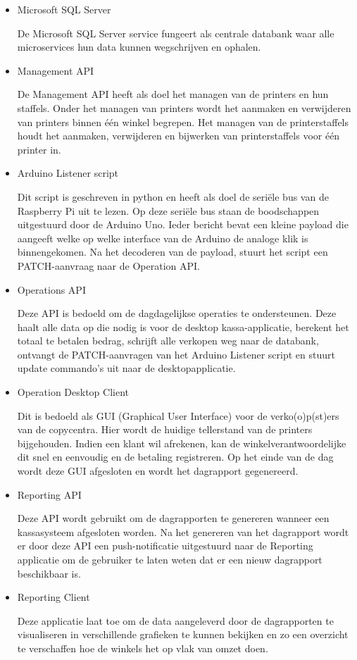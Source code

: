 \begin{itemize}
    \item Microsoft SQL Server
    
    De Microsoft SQL Server service fungeert als centrale databank waar alle microservices hun data kunnen wegschrijven en ophalen.
    
    \item Management API
    
    De Management API heeft als doel het managen van de printers en hun staffels. Onder het managen van printers wordt het aanmaken en verwijderen van printers binnen één winkel begrepen. Het managen van de printerstaffels houdt het aanmaken, verwijderen en bijwerken van printerstaffels voor één printer in.
    
    \item Arduino Listener script
    
    Dit script is geschreven in python en heeft als doel de seriële bus van de Raspberry Pi uit te lezen. Op deze seriële bus staan de boodschappen uitgestuurd door de Arduino Uno. Ieder bericht bevat een kleine payload die aangeeft welke op welke interface van de Arduino de analoge klik is binnengekomen. Na het decoderen van de payload, stuurt het script een PATCH-aanvraag naar de Operation API.
    
    \item Operations API
    
    Deze API is bedoeld om de dagdagelijkse operaties te ondersteunen. Deze haalt alle data op die nodig is voor de desktop kassa-applicatie, berekent het totaal te betalen bedrag, schrijft alle verkopen weg naar de databank, ontvangt de PATCH-aanvragen van het Arduino Listener script en stuurt update commando's uit naar de desktopapplicatie.
    
    \item Operation Desktop Client
    
    Dit is bedoeld als GUI (Graphical User Interface) voor de verko(o)p(st)ers van de copycentra. Hier wordt de huidige tellerstand van de printers bijgehouden. Indien een klant wil afrekenen, kan de winkelverantwoordelijke dit snel en eenvoudig en de betaling registreren. Op het einde van de dag wordt deze GUI afgesloten en wordt het dagrapport gegenereerd.
    
    \item Reporting API
    
    Deze API wordt gebruikt om de dagrapporten te genereren wanneer een kassasysteem afgesloten worden. Na het genereren van het dagrapport wordt er door deze API een push-notificatie uitgestuurd naar de Reporting applicatie om de gebruiker te laten weten dat er een nieuw dagrapport beschikbaar is.
    
    \item Reporting Client
    
    Deze applicatie laat toe om de data aangeleverd door de dagrapporten te visualiseren in verschillende grafieken te kunnen bekijken en zo een overzicht te verschaffen hoe de winkels het op vlak van omzet doen.
\end{itemize}